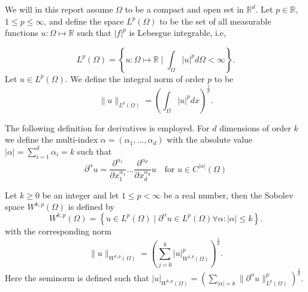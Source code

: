 \documentclass[11pt]{article}
\theoremstyle{remark}
\newcommand{\abs}[1]{\left\lvert #1 \right\rvert}
\renewcommand{\le}{\leqslant}
\renewcommand{\ge}{\geqslant}
\numberwithin{equation}{section}
\begin{document}
We will in this report assume $\Omega $ to be a compact and open set in $\mathbb{R} ^{d}$. Let $p \in \mathbb{R} $, $ 1 \le  p \le  \infty$, and  define the space $L^{p}\left( \Omega  \right) $ to be the set of all measurable functions $u: \Omega  \mapsto \mathbb{R} $ such that
$\left\lvert f \right\rvert ^{p}$ is Lebesgue integrable, i.e,

\begin{equation*}
    L^{p}\left( \Omega  \right) = \left\{ u: \Omega \mapsto \mathbb{R}  \mid \int_{\Omega }^{} \left\lvert u \right\rvert ^{p} d \Omega  < \infty  \right\}
.\end{equation*}
Let $u \in L^{p}\left( \Omega  \right) $. We define the integral norm of order $p$ to be \[
\| u \|_{ L^{p}\left( \Omega  \right)  }^{  }  = \left( \int_{\Omega }^{} \left\lvert u \right\rvert ^{p} dx  \right) ^{\frac{1}{p}}.
\]

The following definition for derivatives is employed.
For $d$ dimensions of order $k$ we define the multi-index $\alpha  = ( \alpha _{1}, \ldots, \alpha _{d})  $ with the absolute value $\abs{ \alpha  } = \sum_{i=1}^{d}  \alpha _{i} = k $ such that
\begin{equation}
    \label{eq:der}
\partial ^{\alpha} u = \frac{\partial ^{ \alpha_{1}  }  } {\partial^{} x_{1}^{\alpha _{1}}  } \ldots \frac{\partial ^{ \alpha_{d}  }  } {\partial^{} x_{d}^{\alpha _{d}}  } u \quad  \text{for }u \in C^{\left\lvert \alpha  \right\rvert }( \Omega )
\end{equation}

  Let $k\ge 0$ be an integer and let $1 \le  p <  \infty$ be a real number, then the Sobolev space $W^{k,p}( \Omega ) $ is defined by
  \begin{equation}
W^{k,p}\left( \Omega  \right) = \left\{ u \in L^{p}\left( \Omega  \right)  \mid  \partial ^{\alpha } u \in L^{p}\left( \Omega  \right)  \forall \alpha : \left\lvert \alpha  \right\rvert  \le k \right\}.
  \end{equation}
with the corresponding norm
\begin{equation}
\| u \|_{ W^{k,p}\left( \Omega  \right)  }^{  }  = \left(   \sum_{j = 0}^{k}  \left\lvert u \right\rvert ^{p} _{  W^{j,p}\left( \Omega  \right) } \right)^{\frac{1}{p}} .
\end{equation}
Here the seminorm is defined such that $ \left\lvert u \right\rvert _{W^{k,p}( \Omega  ) }^{} =  ( \sum_{\left\lvert \alpha  \right\rvert  = k}^{} \| \partial ^{\alpha }u \|_{ L^{p}( \Omega )   }^{ p } )^{\frac{1}{p}} $.
\end{document}
